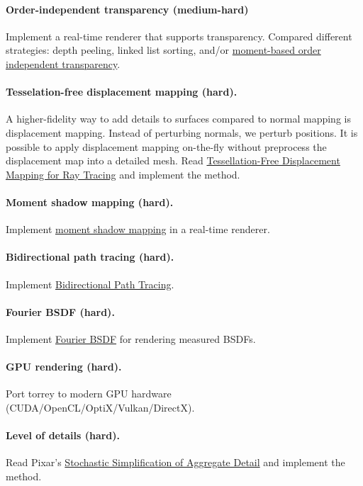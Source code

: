 \paragraph{Order-independent transparency (medium-hard)}
Implement a real-time renderer that supports transparency. Compared different strategies: depth peeling, linked list sorting, and/or \href{https://momentsingraphics.de/I3D2018.html}{moment-based order independent transparency}.

\paragraph{Tesselation-free displacement mapping (hard).}
A higher-fidelity way to add details to surfaces compared to normal mapping is displacement mapping. Instead of perturbing normals, we perturb positions. It is possible to apply displacement mapping on-the-fly without preprocess the displacement map into a detailed mesh. Read \href{https://perso.telecom-paristech.fr/boubek/papers/TFDM/}{Tessellation-Free Displacement Mapping for Ray Tracing} and implement the method.

\paragraph{Moment shadow mapping (hard).}
Implement \href{https://momentsingraphics.de/I3D2015.html}{moment shadow mapping} in a real-time renderer.

\paragraph{Bidirectional path tracing (hard).}
Implement \href{https://www.pbr-book.org/3ed-2018/Light_Transport_III_Bidirectional_Methods/Bidirectional_Path_Tracing}{Bidirectional Path Tracing}.

\paragraph{Fourier BSDF (hard).}
Implement \href{https://www.pbr-book.org/3ed-2018/Reflection_Models/Fourier_Basis_BSDFs}{Fourier BSDF} for rendering measured BSDFs.

\paragraph{GPU rendering (hard).}
Port torrey to modern GPU hardware (CUDA/OpenCL/OptiX/Vulkan/DirectX).

\paragraph{Level of details (hard).}
Read Pixar's \href{https://graphics.pixar.com/library/StochasticSimplification/paper.pdf}{Stochastic Simplification of Aggregate Detail} and implement the method.

% 
% 


